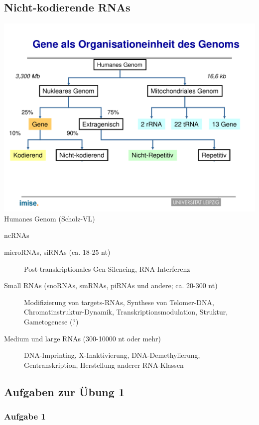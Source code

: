\subsection{Nicht-kodierende RNAs}
    \includegraphics[width=1\textwidth]{lectures/V1/pix/31.pdf}\\
    \caption{Humanes Genom (Scholz-VL)}
    \begin{block}{ncRNAs}
        \begin{description}
            \item[microRNAs, siRNAs (ca. 18-25 nt)] Post-transkriptionales Gen-Silencing, RNA-Interferenz
            \item[Small RNAs (snoRNAs, smRNAs, piRNAs und andere; ca. 20-300 nt)] Modifizierung von targets-RNAs, Synthese von Telomer-DNA, Chromatinstruktur-Dynamik, Transkriptionsmodulation, Struktur, Gametogenese (?)
            \item[Medium und large RNAs (300-10000 nt oder mehr)] DNA-Imprinting, X-Inaktivierung, DNA-Demethylierung, Gentranskription, Herstellung anderer RNA-Klassen
        \end{description}

    \end{block}


\subsection{Aufgaben zur Übung 1}
\subsubsection{Aufgabe 1}


